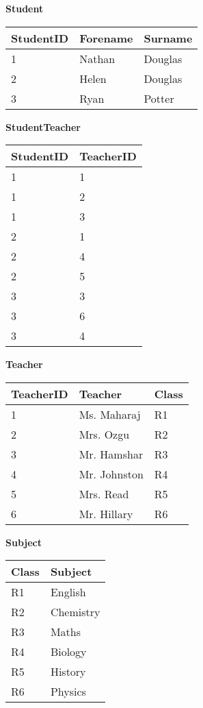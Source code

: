 \begin{table}[H]
	\textbf{Student}
	
	\begin{tabular}{| l | l | l |}
		\hline
		StudentID & Forename & Surname \\\hline
		1 & Nathan & Douglas\\\hline
		2 & Helen & Douglas\\\hline
		3 & Ryan & Potter\\\hline
	\end{tabular}
	
	\vspace{0.5cm}
	
	\textbf{StudentTeacher}
	
	\begin{tabular}{| l | l |}
		\hline
		StudentID & TeacherID\\\hline
		1 & 1\\\hline
		1 & 2\\\hline
		1 & 3\\\hline
		2 & 1\\\hline
		2 & 4\\\hline
		2 & 5\\\hline
		3 & 3\\\hline
		3 & 6\\\hline
		3 & 4\\\hline
	\end{tabular}
	
	\vspace{0.5cm}
	
	\textbf{Teacher}
	
	\begin{tabular}{| l | l | l |}
		\hline
		TeacherID & Teacher & Class \\\hline
		1 & Ms. Maharaj & R1 \\\hline
		2 & Mrs. Ozgu & R2 \\\hline
		3 & Mr. Hamshar & R3 \\\hline
		4 & Mr. Johnston & R4 \\\hline
		5 & Mrs. Read & R5 \\\hline
		6 & Mr. Hillary & R6 \\\hline
	\end{tabular}
	
	\vspace{0.5cm}
	
	\textbf{Subject}
	
	\begin{tabular}{| l | l |}
		\hline
		Class & Subject \\\hline
		R1 & English \\\hline
		R2 & Chemistry \\\hline
		R3 & Maths \\\hline
		R4 & Biology \\\hline
		R5 & History \\\hline
		R6 & Physics \\\hline
	\end{tabular}
\end{table}

